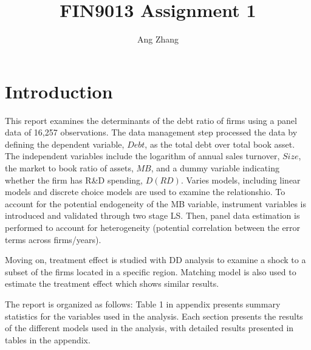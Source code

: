 \documentclass{article}
\title{FIN9013 Assignment 1}
\author{Ang Zhang}
\begin{document}
\maketitle

\singlespacing

\section*{Introduction}
This report examines the determinants of the debt ratio of firms using a panel data of 16,257 observations.
The data management step processed the data by defining the dependent variable, $Debt$, as the total debt over total book asset.
The independent variables include the logarithm of annual sales turnover, $Size$, the market to book ratio of assets, $MB$,
and a dummy variable indicating whether the firm has R\&D spending, $D(RD)$.
Varies models, including linear models and discrete choice models are used to examine the relationshio.
To account for the potential endogeneity of the MB variable, instrument variables is introduced and
validated through two stage LS. Then, panel data estimation is performed to account for
heterogeneity (potential correlation between the error terms across firms/years).

Moving on, treatment effect is studied with DD analysis to examine a shock to a subset of the firms
located in a specific region. Matching model is also used to estimate the treatment effect which shows similar results.

The report is organized as follows: Table 1 in appendix presents summary statistics for the variables used in the analysis.
Each section presents the results of the different models used in the analysis, with detailed results
presented in tables in the appendix.
\end{document}
